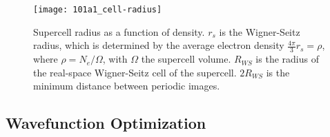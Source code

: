 \begin{figure}[h]
	\centering
	\texttt{[image: 101a1\_cell-radius]}
	\caption{Supercell radius as a function of density. $r_s$ is the Wigner-Seitz radius, which is determined by the average electron density $\frac{4\pi}{3}r_s=\rho$, where $\rho=N_e/\Omega$, with $\Omega$ the supercell volume. $R_{WS}$ is the radius of the real-space Wigner-Seitz cell of the supercell. $2R_{WS}$ is the minimum distance between periodic images. \label{fig:cell-radius}}
\end{figure}

%
%

\subsection{Wavefunction Optimization}

